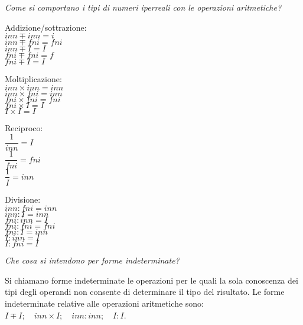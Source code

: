\begin{esercizio}\label{ese:iper_016} 
\emph{Come si comportano i tipi di numeri iperreali con le operazioni 
aritmetiche?}

\noindent\begin{minipage}{.30\textwidth}
 Addizione/sottrazione:\\
\(inn \mp inn = i\)\\
\(inn \mp fni = fni\)\\
\(inn \mp I = I\)\\
\(fni \mp fni = f\)\\
\(fni \mp I = I\)
\vspace{24pt}
\end{minipage}
\noindent\begin{minipage}{.25\textwidth}
 Moltiplicazione:\\
\(inn \times inn = inn\)\\
\(inn \times fni = inn\)\\
\(fni \times fni = fni\)\\
\(fni \times I = I\)\\
\(I \times I = I\)
\vspace{24pt}
\end{minipage}
\noindent\begin{minipage}{.15\textwidth}
 Reciproco:\\
\(\dfrac{1}{inn} = I\)\\
\(\dfrac{1}{fni} = fni\)\\
\(\dfrac{1}{I} = inn\)\\
\vspace{12pt}
\end{minipage}
\noindent\begin{minipage}{.25\textwidth}
 Divisione:\\
\(inn : fni = inn\)\\
\(inn : I = inn\)\\
\(fni : inn = I\)\\
\(fni : fni = fni\)\\
\(fni : I = inn\)\\
\(I : inn = I\)\\
\(I : fni = I\)
\end{minipage}
\end{esercizio}

\begin{esercizio}\label{ese:iper_017} 
\emph{Che cosa si intendono per forme indeterminate?}

Si chiamano forme indeterminate le operazioni per le quali la sola 
conoscenza dei tipi degli operandi non consente di determinare il tipo del 
risultato. 
Le forme indeterminate relative alle operazioni aritmetiche sono:
\(I \mp I; \quad inn \times I; \quad inn : inn; \quad I : I\).
\end{esercizio}

